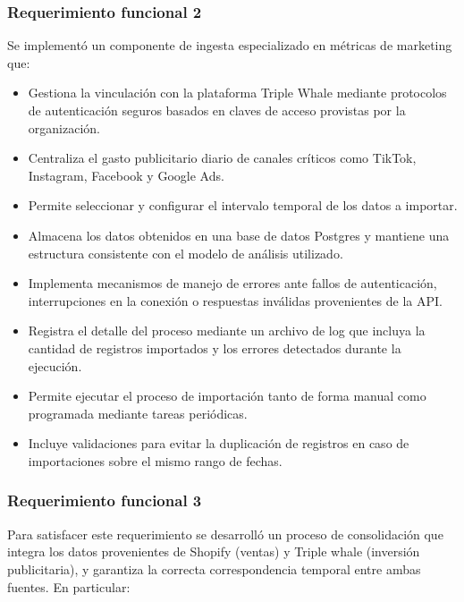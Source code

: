 \subsubsection{Requerimiento funcional 2}

Se implementó un componente de ingesta especializado en métricas de marketing que:

\begin{itemize}
    \item Gestiona la vinculación con la plataforma Triple Whale mediante protocolos de autenticación seguros basados en claves de acceso provistas por la organización.
    
    \item Centraliza el gasto publicitario diario de canales críticos como TikTok, Instagram, Facebook y Google Ads.
    \item Permite seleccionar y configurar el intervalo temporal de los datos a importar.
    \item Almacena los datos obtenidos en una base de datos Postgres y mantiene una estructura consistente con el modelo de análisis utilizado.
    \item Implementa mecanismos de manejo de errores ante fallos de autenticación, interrupciones en la conexión o respuestas inválidas provenientes de la API.
    \item Registra el detalle del proceso mediante un archivo de log que incluya la cantidad de registros importados y los errores detectados durante la ejecución.
    \item Permite ejecutar el proceso de importación tanto de forma manual como programada mediante tareas periódicas.
    \item Incluye validaciones para evitar la duplicación de registros en caso de importaciones sobre el mismo rango de fechas.
\end{itemize}



\subsubsection{Requerimiento funcional 3}

Para satisfacer este requerimiento se desarrolló un proceso de consolidación que integra los datos provenientes de Shopify (ventas) y Triple whale (inversión publicitaria), y garantiza la correcta correspondencia temporal entre ambas fuentes. En particular:

